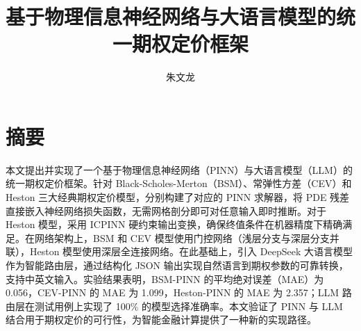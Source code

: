 \confidential{}%
\title{基于物理信息神经网络与大语言模型的统一期权定价框架}%
\author{朱文龙}%
\advisorsec{}%

\chapter*{摘\quad 要}%
\setcounter{page}{1}%

本文提出并实现了一个基于物理信息神经网络（PINN）与大语言模型（LLM）的统一期权定价框架。针对 Black-Scholes-Merton（BSM）、常弹性方差（CEV）和 Heston 三大经典期权定价模型，分别构建了对应的 PINN 求解器，将 PDE 残差直接嵌入神经网络损失函数，无需网格剖分即可对任意输入即时推断。对于 Heston 模型，采用 ICPINN 硬约束输出变换，确保终值条件在机器精度下精确满足。在网络架构上，BSM 和 CEV 模型使用门控网络（浅层分支与深层分支并联），Heston 模型使用深层全连接网络。在此基础上，引入 DeepSeek 大语言模型作为智能路由层，通过结构化 JSON 输出实现自然语言到期权参数的可靠转换，支持中英文输入。实验结果表明，BSM-PINN 的平均绝对误差（MAE）为 0.056，CEV-PINN 的 MAE 为 1.099，Heston-PINN 的 MAE 为 2.357；LLM 路由层在测试用例上实现了 100\% 的模型选择准确率。本文验证了 PINN 与 LLM 结合用于期权定价的可行性，为智能金融计算提供了一种新的实现路径。

